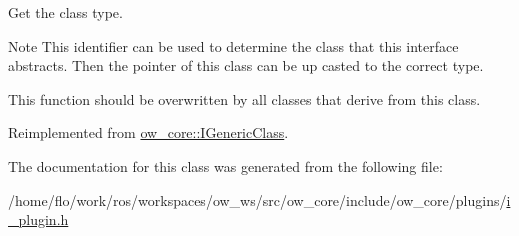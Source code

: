 Get the class type. 

\begin{DoxyNote}{Note}
This identifier can be used to determine the class that this interface abstracts. Then the pointer of this class can be up casted to the correct type.

This function should be overwritten by all classes that derive from this class. 
\end{DoxyNote}


Reimplemented from \hyperlink{classow__core_1_1IGenericClass_ad6ca32fd7189a4bd71c01c10e3677ae4}{ow\+\_\+core\+::\+I\+Generic\+Class}.



The documentation for this class was generated from the following file\+:\begin{DoxyCompactItemize}
\item 
/home/flo/work/ros/workspaces/ow\+\_\+ws/src/ow\+\_\+core/include/ow\+\_\+core/plugins/\hyperlink{i__plugin_8h}{i\+\_\+plugin.\+h}\end{DoxyCompactItemize}
